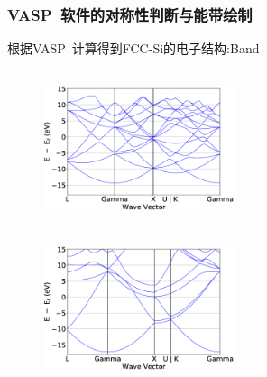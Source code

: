 \documentclass[cjk,slidestop,handout,compress,mathserif,blue]{beamer}	%
\begin{document}
\frame
{
	\frametitle{\textrm{VASP~}软件的对称性判断与能带绘制}
	根据\textrm{VASP~}计算得到\textrm{FCC-Si}的电子结构:\textrm{Band}
\begin{figure}[h!]
\centering
\vspace*{-0.1in}
\hspace*{-0.20in}
\includegraphics[height=1.8in,width=2.2in,viewport=0 0 890 570,clip]{Figures/VASP_FCC_Si-Band_4.eps}
\hspace*{0.01in}
\includegraphics[height=1.8in,width=2.2in,viewport=0 0 890 570,clip]{Figures/VASP_FCC_Si-Band_1.eps}
\caption{\fontsize{7.2pt}{4.2pt}}%
\label{FCC_Si-Band}
\end{figure} 
}
\end{document}

